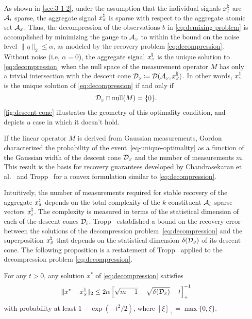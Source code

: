 As shown in \autoref{sec:3-1-2}, under the assumption that the individual signals $x_i^{\natural}$ are $\mathcal{A}_i$ sparse, the aggregate signal $x_{\scriptscriptstyle S}^\natural$ is sparse with respect to the aggregate atomic set $\mathcal{A}_{\scriptscriptstyle S}$.
Thus, the decompression of the observations $b$ in \eqref{eq:demixing-problem} is accomplished by minimizing the gauge to $\mathcal{A}_{\scriptscriptstyle S}$ to within the bound on the noise level $\|\eta\|_2\le\alpha$, as modeled by the recovery problem \eqref{eq:decompression}.
Without noise (i.e, $\alpha=0$), the aggregate signal $x_{\scriptscriptstyle S}^\natural$ is the unique solution to \eqref{eq:decompression} when the null space of the measurement operator $M$ has only a trivial intersection with the descent cone $\mathcal{D}_{\scriptscriptstyle S}\coloneqq\mathcal{D}(\mathcal{A}_{\scriptscriptstyle S}, x_{\scriptscriptstyle S}^\natural)$. 
In other words, $x_{\scriptscriptstyle S}^\natural$ is the unique solution of \eqref{eq:decompression} if and only if 
\begin{equation}\label{eq-unique-optimality}
  \mathcal{D}_{\scriptscriptstyle S}\cap\operatorname{null}(M) = \{0\}.  
\end{equation}
\autoref{fig:descent-cone} illustrates the geometry of this optimality condition, and depicts a case in which it doesn't hold.

If the linear operator $M$ is derived from Gaussian measurements, Gordon~\cite{gordon1988milman} characterized the probability of the event~\eqref{eq-unique-optimality} as a function of the Gaussian width of the descent cone $\mathcal{D}_{\scriptscriptstyle S}$ and the number of measurements $m$. This result is the basis for recovery guarantees developed by Chandrasekaran et al.~\cite{chandrasekaran2012convex} and Tropp~\cite{tropp2015convex} for a convex formulation similar to \eqref{eq:decompression}.

Intuitively, the number of measurements required for stable recovery of the aggregate $x_{\scriptscriptstyle S}^\natural$ depends on the total complexity of the $k$ constituent $\mathcal{A}_i$-sparse vectors $x_i^{\natural}$. The complexity is measured in terms of the statistical dimension of each of the descent cones $\mathcal{D}_i$. Tropp~\cite[Corollary~3.5]{tropp2015convex} established a bound on the recovery error between the solutions of the decompression problem~\eqref{eq:decompression} and the superposition $x_{\scriptscriptstyle S}^{\natural}$ that depends on the statistical dimension $\delta(\mathcal{D}_{\scriptscriptstyle S})$ of its descent cone. The following proposition is a restatement of Tropp~\cite[Corollary~3.5]{tropp2015convex} applied to the decompression problem \eqref{eq:decompression}.

\begin{proposition}%
    \label{thm:tropp}
    For any $t>0$, any solution $x^*$ of \eqref{eq:decompression} satisfies
    \begin{equation*}
        \|x^* - x_{\scriptscriptstyle S}^\natural\|_2 \leq 2\alpha\left[\sqrt{m - 1} - \sqrt{\delta(\mathcal{D}_{\scriptscriptstyle S})} - t\right]_+^{-1}
    \end{equation*}
    with probability at least $1 - \exp(-t^2/2)$, where $[\xi]_+=\max\{0,\xi\}$. 
\end{proposition}


